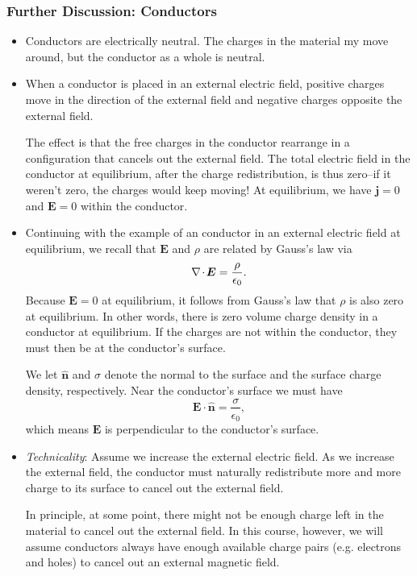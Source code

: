 \documentclass[11pt, a4paper]{article}
\renewcommand{\vec}[1]{\bm{#1}} %
\newcommand{\uvec}[1]{\hat{\vec{#1}}} %
\newcommand{\E}{\vec{E}} %
\newcommand{\ee}{\epsilon_{0}}  %
\renewcommand{\j}{\vec{j}}  %
\renewcommand{\div}{\nabla \mspace{-2mu} \cdot \mspace{-2mu}}
\begin{document}
\subsubsection{Further Discussion: Conductors}
\begin{itemize}
	
    \item Conductors are electrically neutral. The charges in the material my move around, but the conductor as a whole is neutral.
	
	\item When a conductor is placed in an external electric field, positive charges move in the direction of the external field and negative charges opposite the external field. 
	
	The effect is that the free charges in the conductor rearrange in a configuration that cancels out the external field. The total electric field in the conductor at equilibrium, after the charge redistribution, is thus zero--if it weren't zero, the charges would keep moving! At equilibrium, we have $ \j = 0 $ and $ \E = 0 $ within the conductor.
	
	\item Continuing with the example of an conductor in an external electric field at equilibrium, we recall that $ \E $ and $ \rho $ are related by Gauss's law via
	\begin{equation*}
		\div \E = \frac{\rho}{\ee}.
	\end{equation*}
    Because $ \E = 0 $ at equilibrium, it follows from Gauss's law that $ \rho $ is also zero at equilibrium. In other words, there is zero volume charge density in a conductor at equilibrium. If the charges are not within the conductor, they must then be at the conductor's surface.

    We let $ \uvec{n} $ and $ \sigma $ denote the normal to the surface and the surface charge density, respectively. Near the conductor's surface we must have 
	\begin{equation*}
		\E \cdot \uvec{n} = \frac{\sigma}{\ee},
	\end{equation*}
	which means $ \E $ is perpendicular to the conductor's surface.
	
	\item \textit{Technicality}: Assume we increase the external electric field. As we increase the external field, the conductor must naturally redistribute more and more charge to its surface to cancel out the external field. 
	
	In principle, at some point, there might not be enough charge left in the material to cancel out the external field. In this course, however, we will assume conductors always have enough available charge pairs (e.g. electrons and holes) to cancel out an external magnetic field. 
	

\end{itemize}
\end{document}
